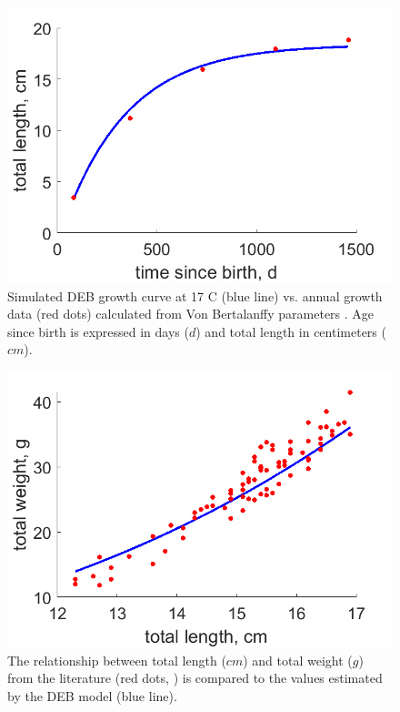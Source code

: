 \begin{figure}[H]
	\includegraphics[width=1.0\textwidth]{figures/Chap4AdultDataVSModel.png}
	\centering
	\caption{Simulated DEB growth curve at 17 \textdegree C (blue line) vs. annual growth data (red dots) calculated from Von Bertalanffy parameters \citep{PaloMuck1987}. Age since birth is expressed in days ($d$) and total length in centimeters ($cm$).}
	\label{Chap4AdultDataVSModel}
\end{figure}

\begin{figure}[ht]
	\includegraphics[width=1.0\textwidth]{figures/Chap4LengthVSWeight.png}
	\centering
	\caption{The relationship between total length ($cm$) and total weight ($g$) from the literature (red dots, \cite{Mina1968}) is compared to the values estimated by the DEB model (blue line).}
	\label{Chap4LengthVSWeight}
\end{figure}


